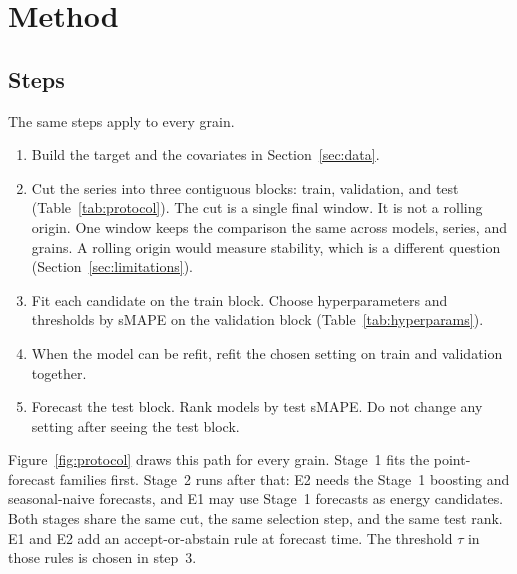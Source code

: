 \section{Method}
\label{sec:method}

\subsection{Steps}
\label{sec:protocol}

The same steps apply to every grain.

\begin{enumerate}
  \item Build the target and the covariates in Section~\ref{sec:data}.
  \item Cut the series into three contiguous blocks: train, validation, and test (Table~\ref{tab:protocol}).
        The cut is a single final window.
        It is not a rolling origin.
        One window keeps the comparison the same across models, series, and grains.
        A rolling origin would measure stability, which is a different question (Section~\ref{sec:limitations}).
  \item Fit each candidate on the train block.
        Choose hyperparameters and thresholds by sMAPE on the validation block
        (Table~\ref{tab:hyperparams}).
  \item When the model can be refit, refit the chosen setting on train and validation together.
  \item Forecast the test block.
        Rank models by test sMAPE.
        Do not change any setting after seeing the test block.
\end{enumerate}

Figure~\ref{fig:protocol} draws this path for every grain.
Stage~1 fits the point-forecast families first.
Stage~2 runs after that: E2 needs the Stage~1 boosting and seasonal-naive forecasts, and E1 may use Stage~1 forecasts as energy candidates.
Both stages share the same cut, the same selection step, and the same test rank.
E1 and E2 add an accept-or-abstain rule at forecast time.
The threshold $\tau$ in those rules is chosen in step~3.

